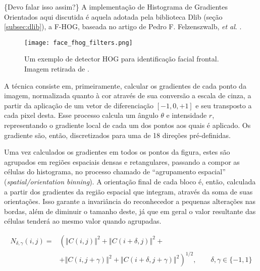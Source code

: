 \{Devo falar isso assim?\} A implementação de Histograma de Gradientes Orientados aqui discutida é aquela adotada pela biblioteca Dlib (seção \ref{subsec:dlib}), a F-HOG, baseada no artigo de Pedro F. Felzenszwalb, \textit{et al}. \cite{felzenszwalbObjectDetectionDiscriminatively}.

\begin{figure}[ht]
    \centering
    \texttt{[image: face\_fhog\_filters.png]}
    \caption{Um exemplo de detector HOG para identificação facial frontal. Imagem retirada de \cite{kingDlib18Released}.}
    \label{fig:dlib_hog}
\end{figure}

A técnica consiste em, primeiramente, calcular os gradientes de cada ponto da imagem, normalizada quanto à cor através de sua conversão a escala de cinza, a partir da aplicação de um vetor de diferenciação $[-1, 0, +1]$ e seu transposto a cada pixel desta.
Esse processo calcula um ângulo $\theta$ e intensidade $r$, representando o gradiente local de cada um dos pontos aos quais é aplicado.
Os gradiente são, então, discretizados para uma de 18 direções pré-definidas.

Uma vez calculados os gradientes em todos os pontos da figura, estes são agrupados em regiões espaciais densas e retangulares, passando a compor as células do histograma, no processo chamado de ``agrupamento espacial'' (\textit{spatial/orientation binning}).
A orientação final de cada bloco é, então, calculada a partir dos gradientes da região espacial que integram, através da soma de suas orientações.
Isso garante a invariância do reconhecedor a pequenas alterações nas bordas, além de diminuir o tamanho deste, já que em geral o valor resultante das células tenderá ao mesmo valor quando agrupadas.

\begin{equation}\label{eq:hog_energy}
    \begin{split}
        N_{\delta,\gamma}(i,j) = & \left(
            \left\Vert C(i,j) \right\Vert ^2 +
            \left\Vert C(i+\delta,j) \right\Vert ^2 +
            \right.\\ 
            & + \left. \left\Vert C(i,j+\gamma) \right\Vert ^2 +
            \left\Vert C(i+\delta,j+\gamma) \right\Vert ^2
            \right)^{1/2}, \qquad \delta,\gamma \in \{-1, 1\}
    \end{split}
\end{equation}

